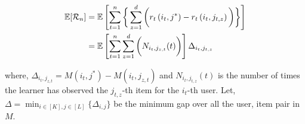 \begin{align*}
\mathbb{E}[\mathcal{R}_n] & = \mathbb{E}\left [ \sum_{t=1}^{n}\bigg\lbrace\sum_{z=1}^{d} \bigg( r_{t}\left(i_t, j^* \right) - r_{t}\left( i_t, j_{t,z}\right)\bigg)\bigg\rbrace\right] \\
&= \mathbb{E}\left [ \sum_{t=1}^{n} \sum_{z=1}^{d} \bigg( N_{i_t,j_{z,t}}(t)\bigg) \right ]\Delta_{i_t,j_{t,z}}
\end{align*}

where, $\Delta_{i_t,j_{z,t}} = M(i_t,j^*) - M(i_t,j_{z,t})$ and $N_{i_t,j_{t,z}}(t)$ is the number of times the learner has observed the $j_{t,z}$-th item for the $i_t$-th user. Let, $\Delta = \min_{i\in[K],j\in[L]}\lbrace \Delta_{i,j}\rbrace$ be the minimum gap over all the user, item pair in $M$.
